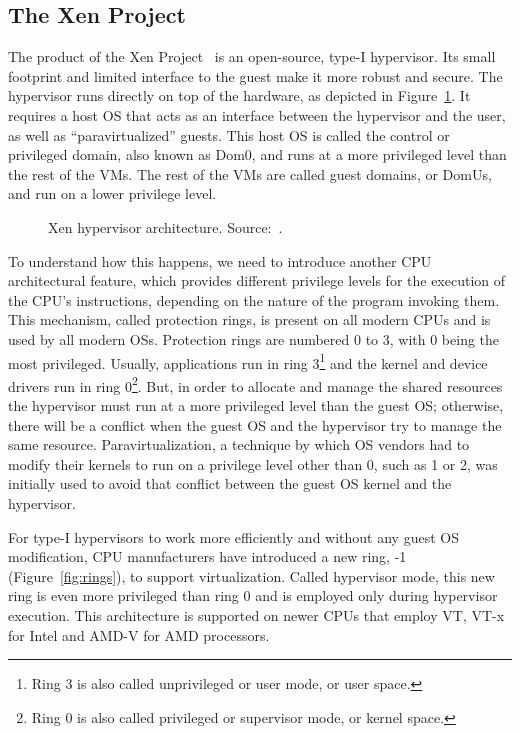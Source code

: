 \subsection{The Xen Project}\label{sub:xen}
The product of the Xen Project~\cite{xen} is an open-source, type-I hypervisor. Its small footprint and limited interface to the guest make it more robust and secure. The hypervisor runs directly on top of the hardware, as depicted in Figure~\ref{img:xen}. It requires a host \ac{OS} that acts as an interface between the hypervisor and the user, as well as ``paravirtualized'' guests. This host \ac{OS} is called the control or privileged domain, also known as Dom0, and runs at a more privileged level than the rest of the \ac{VM}s. The rest of the \acp{VM} are called guest domains, or DomUs, and run on a lower privilege level. 

\begin{figure}
	\centering
	
	\caption{Xen hypervisor architecture. Source:~\cite{xen}.}
	\label{img:xen}
\end{figure}

\par To understand how this happens, we need to introduce another \ac{CPU} architectural feature, which provides different privilege levels for the execution of the \ac{CPU}'s instructions, depending on the nature of the program invoking them. This mechanism, called protection rings, is present on all modern \ac{CPU}s and is used by all modern \acp{OS}. Protection rings are numbered 0 to 3, with 0 being the most privileged. Usually, applications run in ring 3\footnote{Ring 3 is also called unprivileged or user mode, or user space.} and the kernel and device drivers run in ring 0\footnote{Ring 0 is also called privileged or supervisor mode, or kernel space.}. But, in order to allocate and manage the shared resources the hypervisor must run at a more privileged level than the guest \ac{OS}; otherwise, there will be a conflict when the guest \ac{OS} and the hypervisor try to manage the same resource. Paravirtualization, a technique by which \ac{OS} vendors had to modify their kernels to run on a privilege level other than 0, such as 1 or 2, was initially used to avoid that conflict between the guest \ac{OS} kernel and the hypervisor.

\par For type-I hypervisors to work more efficiently and without any guest \ac{OS} modification, \ac{CPU} manufacturers have introduced a new ring, -1 (Figure~\ref{fig:rings}), to support virtualization. Called hypervisor mode, this new ring is even more privileged than ring 0 and is employed only during hypervisor execution. This architecture is supported on newer \ac{CPU}s that employ \ac{VT}, VT-x for Intel and AMD-V for AMD processors. 

